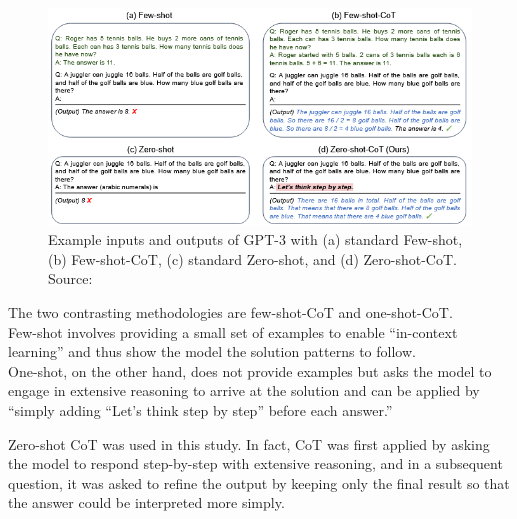 \documentclass[12pt]{article}
\begin{document}
    \begin{figure}[H]
    \centering
            \includegraphics[width=1\textwidth]{CoTTheory.png}
    \caption[Few-shot and one-shot CoT]{Example inputs and outputs of GPT-3 with (a) standard Few-shot, (b) Few-shot-CoT, (c) standard Zero-shot, and (d) Zero-shot-CoT. Source: \cite{kojima2023largelanguagemodelszeroshot}}
    \end{figure} 
    
    The two contrasting methodologies are few-shot-CoT and one-shot-CoT.\\
Few-shot involves providing a small set of examples to enable “in-context learning” and thus show the model the solution patterns to follow.\\
One-shot, on the other hand, does not provide examples but asks the model to engage in extensive reasoning to arrive at the solution and can be applied by “simply adding ``Let's think step by step'' before each answer.”\cite{kojima2023largelanguagemodelszeroshot}

Zero-shot CoT was used in this study. In fact, CoT was first applied by asking the model to respond step-by-step with extensive reasoning, and in a subsequent question, it was asked to refine the output by keeping only the final result so that the answer could be interpreted more simply.\\
\end{document}
